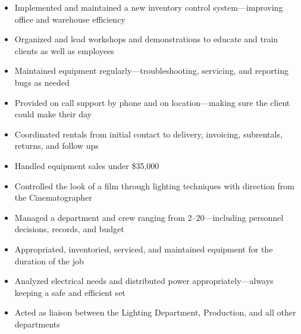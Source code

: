 \documentclass[letterpaper]{article}        %
\begin{document}
  
  
  \begin{itemize}
  
  \item Implemented and maintained a new inventory control system---improving office and warehouse efficiency
  
  \item Organized and lead workshops and demonstrations to educate and train clients as well as employees
  
  \item Maintained equipment regularly---troubleshooting, servicing, and reporting bugs as needed
  
  \item Provided on call support by phone and on location---making sure the client could make their day
  
  \item Coordinated rentals from initial contact to delivery, invoicing, subrentals, returns, and follow ups
  
  \item Handled equipment sales under \$35,000
  
  \end{itemize}
  
  
  
  \begin{itemize}
  
  \item Controlled the look of a film through lighting techniques with direction from the Cinematographer
  
  \item Managed a department and crew ranging from 2--20---including personnel decisions, records, and budget
  
  \item Appropriated, inventoried, serviced, and maintained equipment for the duration of the job
  
  \item Analyzed electrical needs and distributed power appropriately---always keeping a safe and efficient set
  
  \item Acted as liaison between the Lighting Department, Production, and all other departments
  
  \end{itemize}
  
\end{document}

